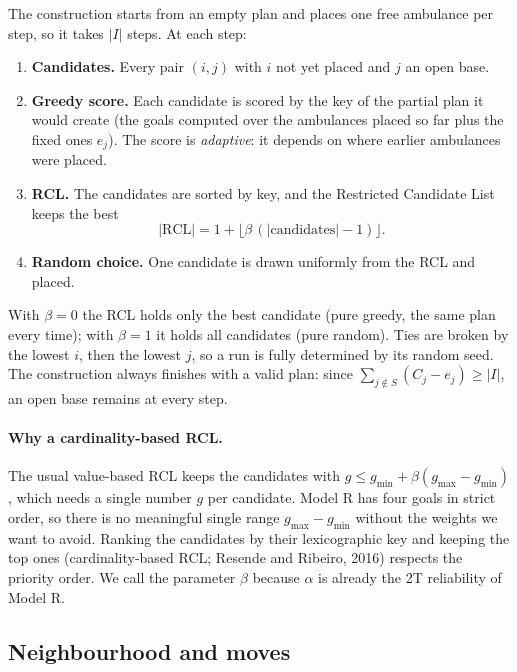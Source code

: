 The construction starts from an empty plan and places one free ambulance per step, so it takes
$|I|$ steps. At each step:
\begin{enumerate}[itemsep=0pt]
  \item \textbf{Candidates.} Every pair $(i, j)$ with $i$ not yet placed and $j$ an open base.
  \item \textbf{Greedy score.} Each candidate is scored by the key of the partial plan it would
        create (the goals computed over the ambulances placed so far plus the fixed ones $e_j$).
        The score is \emph{adaptive}: it depends on where earlier ambulances were placed.
  \item \textbf{RCL.} The candidates are sorted by key, and the Restricted Candidate List keeps
        the best
        \[ |\mathrm{RCL}| = 1 + \lfloor \beta\,(|\text{candidates}| - 1) \rfloor . \]
  \item \textbf{Random choice.} One candidate is drawn uniformly from the RCL and placed.
\end{enumerate}
With $\beta = 0$ the RCL holds only the best candidate (pure greedy, the same plan every time);
with $\beta = 1$ it holds all candidates (pure random). Ties are broken by the lowest $i$, then
the lowest $j$, so a run is fully determined by its random seed. The construction always
finishes with a valid plan: since $\sum_{j \notin S}(C_j - e_j) \ge |I|$, an open base remains
at every step.

\paragraph{Why a cardinality-based RCL.} The usual value-based RCL keeps the candidates with
$g \le g_{\min} + \beta (g_{\max} - g_{\min})$, which needs a single number $g$ per candidate.
Model R has four goals in strict order, so there is no meaningful single range
$g_{\max} - g_{\min}$ without the weights we want to avoid. Ranking the candidates by their
lexicographic key and keeping the top ones (cardinality-based RCL; Resende and Ribeiro, 2016)
respects the priority order. We call the parameter $\beta$ because $\alpha$ is already the 2T
reliability of Model R.

\subsection{Neighbourhood and moves}

